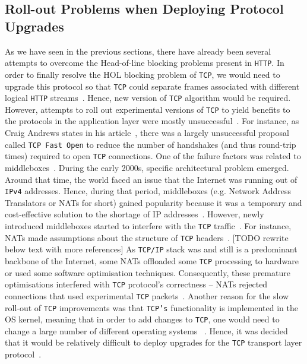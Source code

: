 \documentclass[12pt,a4paper,twoside,openright]{report}
\begin{document}
\subsection{Roll-out Problems when Deploying Protocol Upgrades}
As we have seen in the previous sections, there have already been several attempts to overcome the Head-of-line blocking problems present in \texttt{HTTP}.
In order to finally resolve the HOL blocking problem of \texttt{TCP}, we would need to upgrade this protocol so that \texttt{TCP} could separate frames associated with different logical \texttt{HTTP} streams~\cite{head-of-line-blocking-in-quic-and-http-3-the-details}.
Hence, new version of \texttt{TCP} algorithm would be required. 
However, attempts to roll out experimental versions of \texttt{TCP} to yield benefits to the protocols in the application layer were mostly unsuccessful~\cite{bib_Netdev_0x13_QUIC_Tutorial, PollardBarry2019HiAP}.
For instance, as Craig Andrews states in his article~\cite{the-sad-story-of-tcp-fast-open}, there was a largely unsuccessful proposal called \texttt{TCP Fast Open} to reduce the number of handshakes (and thus round-trip times) required to open \texttt{TCP} connections.
One of the failure factors was related to middleboxes~\cite{the-sad-story-of-tcp-fast-open}.
During the early 2000s, specific architectural problem emerged.
Around that time, the world faced an issue that the Internet was running out of \texttt{IPv4} addresses.
Hence, during that period, middleboxes (e.g. Network Address Translators or NATs for short) gained popularity because it was a temporary and cost-effective solution to the shortage of IP addresses~\cite{MurphyNiallRichard2005Ina, bib_Netdev_0x13_QUIC_Tutorial}.
However, newly introduced middleboxes started to interfere with the \texttt{TCP} traffic~\cite{bib_Netdev_0x13_QUIC_Tutorial, PollardBarry2019HiAP}.
For instance, NATs made assumptions about the structure of \texttt{TCP} headers~\cite{bib_Netdev_0x13_QUIC_Tutorial, PollardBarry2019HiAP}.
[TODO rewrite below text with more references]
As \texttt{TCP/IP} stack was and still is a predominant backbone of the Internet, some NATs offloaded some \texttt{TCP} processing to hardware or used some software optimisation techniques.
Consequently, these premature optimisations interfered with \texttt{TCP} protocol's correctness -- NATs rejected connections that used experimental \texttt{TCP} packets~\cite{PollardBarry2019HiAP}.
Another reason for the slow roll-out of \texttt{TCP} improvements was that \texttt{TCP's} functionality is implemented in the OS kernel, meaning that in order to add changes to \texttt{TCP}, one would need to change a large number of different operating systems ~\cite{PollardBarry2019HiAP}.
Hence, it was decided that it would be relatively difficult to deploy upgrades for the \texttt{TCP} transport layer protocol~\cite{head-of-line-blocking-in-quic-and-http-3-the-details}.
\end{document}

